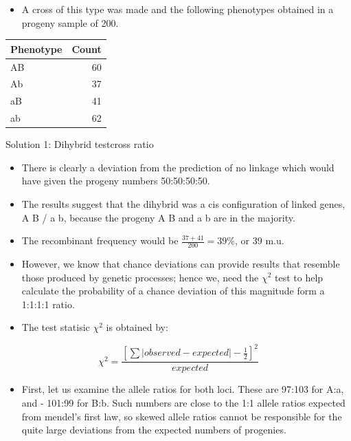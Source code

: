 \documentclass[11pt,ignorenonframetext,aspectratio=169]{beamer}
\providecommand{\tightlist}{%
  \setlength{\itemsep}{0pt}\setlength{\parskip}{0pt}}
\begin{document}
\begin{frame}{}
\protect\hypertarget{section-1}{}
\begin{itemize}
\tightlist
\item
  A cross of this type was made and the following phenotypes obtained in
  a progeny sample of 200.
\end{itemize}

\begin{table}
\centering\begingroup\fontsize{6}{8}\selectfont

\begin{tabular}{lr}
\toprule
Phenotype & Count\\
\midrule
AB & 60\\
Ab & 37\\
aB & 41\\
ab & 62\\
\bottomrule
\end{tabular}
\endgroup{}
\end{table}
\end{frame}

\begin{frame}{Solution 1: Dihybrid testcross ratio}
\protect\hypertarget{solution-1-dihybrid-testcross-ratio}{}
\begin{itemize}
\tightlist
\item
  There is clearly a deviation from the prediction of no linkage which
  would have given the progeny numbers 50:50:50:50.
\item
  The results suggest that the dihybrid was a cis configuration of
  linked genes, A B / a b, because the progeny A B and a b are in the
  majority.
\item
  The recombinant frequency would be \(\frac{37 + 41}{200} = 39\%\), or
  39 m.u.
\item
  However, we know that chance deviations can provide results that
  resemble those produced by genetic processes; hence we, need the
  \(\chi^2\) test to help calculate the probability of a chance
  deviation of this magnitude form a 1:1:1:1 ratio.
\end{itemize}
\end{frame}

\begin{frame}{}
\protect\hypertarget{section-2}{}
\begin{itemize}
\tightlist
\item
  The test statisic \(\chi^2\) is obtained by:
\end{itemize}

\[
\chi^2 = \frac{\left[\sum|observed-expected|-\frac{1}{2}\right]^2}{expected}
\]

\begin{itemize}
\tightlist
\item
  First, let us examine the allele ratios for both loci. These are
  97:103 for A:a, and - 101:99 for B:b. Such numbers are close to the
  1:1 allele ratios expected from mendel's first law, so skewed allele
  ratios cannot be responsible for the quite large deviations from the
  expected numbers of progenies.
\end{itemize}
\end{frame}
\end{document}
